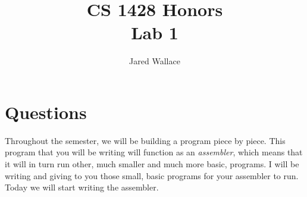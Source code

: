 \documentclass[letterpaper,12pt]{article}
\title{\Large CS 1428 Honors\\Lab 1}
\author{Jared Wallace}
\date{}
\begin{document}
\maketitle

\vspace{30mm}

\section*{Questions}
Throughout the semester, we will be building a program piece by piece.
This program that you will be writing will function as an \emph{assembler},
which means that it will in turn run other, much smaller and much more basic, programs.
I will be writing and giving to you those small, basic programs for your assembler to run.
Today we will start writing the assembler.
\end{document}
